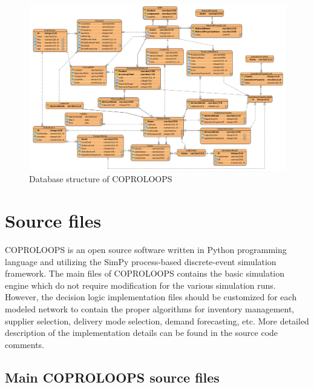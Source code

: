 \documentclass{article}
\newcommand{\NAME}{COPROLOOPS }
\begin{document}
\begin{figure}[ht!]
	\center
	\includegraphics[height=0.95\textwidth,angle=90,origin=c]{datamodel_2024_09_19.png} 
	\caption{Database structure of \NAME}\label{fig:datamodel}
\end{figure}



\section{Source files}

\NAME is an open source software written in Python programming language and utilizing the SimPy process-based discrete-event simulation framework. The main files of \NAME contains the basic simulation engine which do not require modification for the various simulation runs. However, the decision logic implementation files should be customized for each modeled network to contain the proper algorithms for inventory management, supplier selection, delivery mode selection, demand forecasting, etc. More detailed description of the implementation details can be found in the source code comments.


\subsection{Main \NAME source files}
\end{document}
